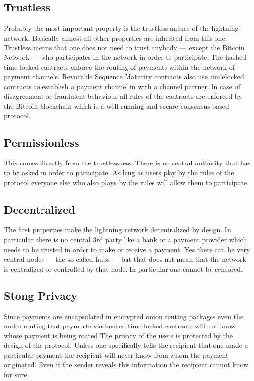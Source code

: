 \documentclass[a4paper,12pt,oneside,openany]{book}
\begin{document}
\subsection{Trustless}
Probably the most important property is the trustless nature of the lightning network. Basically almost all other properties are inherited from this one. 
Trustless means that one does not need to trust anybody --- except the Bitcoin Network --- who participates in the network in order to participate. 
The hashed time locked contracts enforce the routing of payments within the network of payment channels.
Revocable Sequence Maturity contracts also use timlelocked contracts to establish a payment channel in with a channel partner.
In case of disagreement or fraudulent behaviour all rules of the contracts are enforced by the Bitcoin blockchain which is a well running and secure consensus based protocol. 

\subsection{Permissionless}
This comes directly from the trustlessness.
There is no central authority that has to be asked in order to participate.
As long as users play by the rules of the protocol everyone else who also plays by the rules will allow them to participate.

\subsection{Decentralized}
The first properties make the lightning network decentralized by design.
In particular there is no central 3rd party like a bank or a payment provider which needs to be trusted in order to make or receive a payment.
Yes there can be very central nodes --- the so called hubs --- but that does not mean that the network is centralized or controlled by that node.
In particular one cannot be censored. 

\subsection{Stong Privacy}
Since payments are encapsulated in encrypted onion routing packages even the nodes routing that payments via hashed time locked contracts will not know whose payment is being routed
The privacy of the users is protected by the design of the protocol.
Unless one specifically tells the recipient that one made a particular payment the recipient will never know from whom the payment originated.
Even if the sender reveals this information the recipient cannot know for sure.
\end{document}
